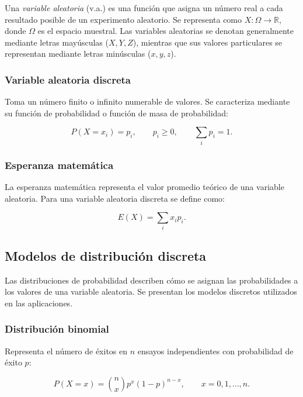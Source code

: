 \documentclass[10pt,letterpaper]{article}
\begin{document}
Una \textit{variable aleatoria} (v.a.) es una función que asigna un número real a cada resultado posible de un experimento aleatorio. Se representa como
$X:\Omega\rightarrow\mathbb{R}$, donde $\Omega$ es el espacio muestral. 
Las variables aleatorias se denotan generalmente mediante letras mayúsculas 
($X,Y,Z$), mientras que sus valores particulares se representan mediante letras 
minúsculas ($x,y,z$).

\subsubsection{Variable aleatoria discreta}

Toma un número finito o infinito numerable 
de valores. Se caracteriza mediante su función de probabilidad o función de masa 
de probabilidad:

\begin{equation}
    P(X=x_i)=p_i,
    \qquad p_i\geq 0,
    \qquad \sum_i p_i=1.
\end{equation}

\subsubsection{Esperanza matemática}

La esperanza matemática representa el valor promedio teórico de una variable aleatoria. Para una variable aleatoria discreta se define como:

\begin{equation}
    E(X)=\sum_i x_i p_i.
\end{equation}

\subsection{Modelos de distribución discreta}

Las distribuciones de probabilidad describen cómo se asignan las probabilidades a los valores de una variable aleatoria. Se presentan los modelos discretos utilizados en las aplicaciones.

\subsubsection{Distribución binomial}

Representa el número de éxitos en $n$ ensayos independientes con probabilidad de éxito $p$:

\[P(X=x)=\binom{n}{x}p^x(1-p)^{n-x},\qquad x=0,1,\dots,n.\]
\end{document}
